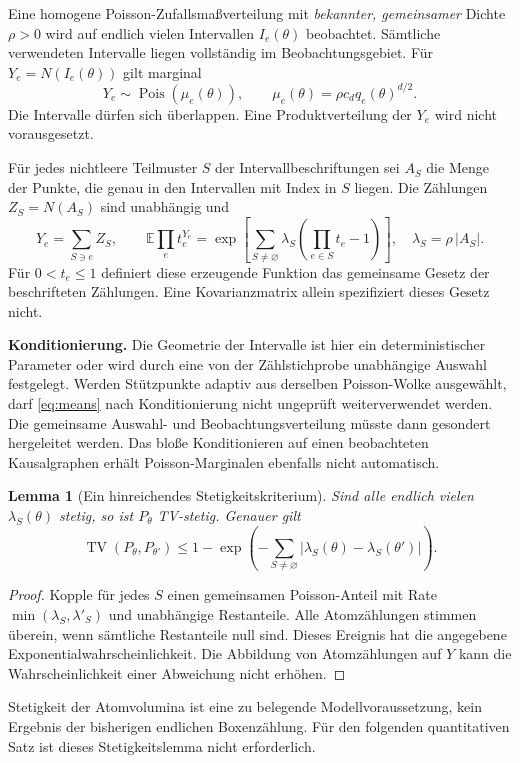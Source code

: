 \documentclass[11pt,a4paper]{article}
\newtheorem{lemma}{Lemma}
\theoremstyle{definition}\newtheorem{definition}{Definition}
\theoremstyle{remark}\newtheorem*{remark}{Bemerkung}
\newcommand{\TV}{\operatorname{TV}}
\newcommand{\Pois}{\operatorname{Pois}}
\begin{document}
Eine homogene Poisson-Zufallsmaßverteilung mit \emph{bekannter, gemeinsamer} Dichte $\rho>0$ wird auf endlich vielen Intervallen $I_e(\theta)$ beobachtet. Sämtliche verwendeten Intervalle liegen vollständig im Beobachtungsgebiet. Für $Y_e=N(I_e(\theta))$ gilt marginal
\begin{equation}\label{eq:means}
 Y_e\sim\Pois(\mu_e(\theta)),\qquad
 \mu_e(\theta)=\rho c_d q_e(\theta)^{d/2}.
\end{equation}
Die Intervalle dürfen sich überlappen. Eine Produktverteilung der $Y_e$ wird nicht vorausgesetzt.

Für jedes nichtleere Teilmuster $S$ der Intervallbeschriftungen sei $A_S$ die Menge der Punkte, die genau in den Intervallen mit Index in $S$ liegen. Die Zählungen $Z_S=N(A_S)$ sind unabhängig und
\begin{equation}\label{eq:atoms}
 Y_e=\sum_{S\ni e}Z_S,\qquad
 \mathbb E\prod_e t_e^{Y_e}
 =\exp\left[\sum_{S\ne\varnothing}\lambda_S
           \left(\prod_{e\in S}t_e-1\right)\right],
 \quad\lambda_S=\rho\,|A_S|.
\end{equation}
Für $0<t_e\leq1$ definiert diese erzeugende Funktion das gemeinsame Gesetz der beschrifteten Zählungen. Eine Kovarianzmatrix allein spezifiziert dieses Gesetz nicht.

\textbf{Konditionierung.} Die Geometrie der Intervalle ist hier ein deterministischer Parameter oder wird durch eine von der Zählstichprobe unabhängige Auswahl festgelegt. Werden Stützpunkte adaptiv aus derselben Poisson-Wolke ausgewählt, darf \eqref{eq:means} nach Konditionierung nicht ungeprüft weiterverwendet werden. Die gemeinsame Auswahl- und Beobachtungsverteilung müsste dann gesondert hergeleitet werden. Das bloße Konditionieren auf einen beobachteten Kausalgraphen erhält Poisson-Marginalen ebenfalls nicht automatisch.

\begin{lemma}[Ein hinreichendes Stetigkeitskriterium]
Sind alle endlich vielen $\lambda_S(\theta)$ stetig, so ist $P_\theta$ TV-stetig. Genauer gilt
\[
 \TV(P_\theta,P_{\theta'})
 \leq1-\exp\!\left(-\sum_{S\ne\varnothing}
                      |\lambda_S(\theta)-\lambda_S(\theta')|\right).
\]
\end{lemma}
\begin{proof}
Kopple für jedes $S$ einen gemeinsamen Poisson-Anteil mit Rate $\min(\lambda_S,\lambda'_S)$ und unabhängige Restanteile. Alle Atomzählungen stimmen überein, wenn sämtliche Restanteile null sind. Dieses Ereignis hat die angegebene Exponentialwahrscheinlichkeit. Die Abbildung von Atomzählungen auf $Y$ kann die Wahrscheinlichkeit einer Abweichung nicht erhöhen.
\end{proof}
Stetigkeit der Atomvolumina ist eine zu belegende Modellvoraussetzung, kein Ergebnis der bisherigen endlichen Boxenzählung. Für den folgenden quantitativen Satz ist dieses Stetigkeitslemma nicht erforderlich.
\end{document}
